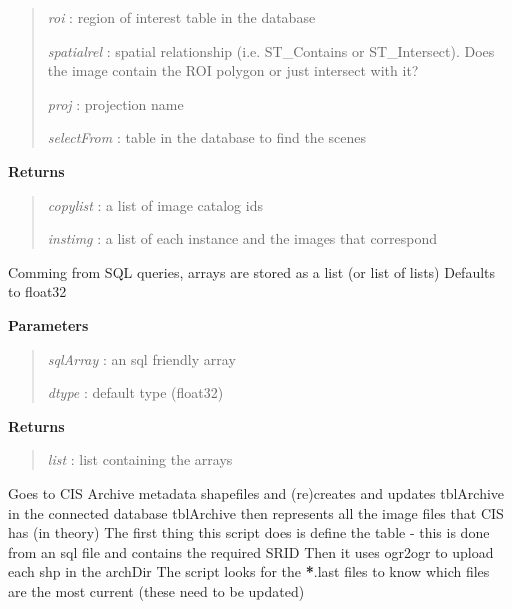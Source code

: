\documentclass[letterpaper,10pt,openany,oneside]{sphinxmanual}
\begin{document}
\begin{fulllineitems}
\begin{fulllineitems}
\begin{quote}
\emph{roi}        : region of interest table in the database

\emph{spatialrel} : spatial relationship (i.e. ST\_Contains or ST\_Intersect).  Does the image contain the ROI polygon or just intersect with it?

\emph{proj}       : projection name

\emph{selectFrom} : table in the database to find the scenes
\end{quote}

\textbf{Returns}
\begin{quote}

\emph{copylist} : a list of image catalog ids

\emph{instimg}  : a list of each instance and the images that correspond
\end{quote}

\end{fulllineitems}


\begin{fulllineitems}
\label{code:Database.Database.sql2numpy}
Comming from SQL queries, arrays are stored as a list (or list of lists)
Defaults to float32

\textbf{Parameters}
\begin{quote}

\emph{sqlArray} : an sql friendly array

\emph{dtype}    : default type (float32)
\end{quote}

\textbf{Returns}
\begin{quote}

\emph{list}     : list containing the arrays
\end{quote}

\end{fulllineitems}


\begin{fulllineitems}
\label{code:Database.Database.updateFromArchive}
Goes to CIS Archive metadata shapefiles and (re)creates and updates tblArchive in the connected database
tblArchive then represents all the image files that CIS has (in theory)
The first thing this script does is define the table - this is done from an sql file and contains the required SRID
Then it uses ogr2ogr to upload each shp in the archDir 
The script looks for the {\color{red}\bfseries{}*}.last files to know which files are the most current (these need to be updated)


\end{fulllineitems}
\end{fulllineitems}
\end{document}
